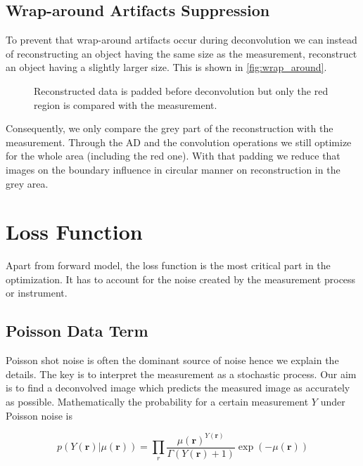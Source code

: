 \documentclass{juliacon}
\begin{document}
\subsection{Wrap-around Artifacts Suppression}
    \label{sec:wrap}
    To prevent that wrap-around artifacts occur during deconvolution we can instead
    of reconstructing an object having the same size as the measurement, reconstruct
    an object having a slightly larger size. This is shown in \autoref{fig:wrap_around}.
    \begin{figure}[h]
        \centering
        \caption{Reconstructed data is padded before deconvolution but only the red region is compared with the measurement.}
        \label{fig:wrap_around}
    \end{figure}
    Consequently, we only compare the grey part of the reconstruction with the measurement.
    Through the AD and the convolution operations we still optimize for the whole area (including the red one).
    With that padding we reduce that images on the boundary influence in circular manner on reconstruction in the grey area.


\section{Loss Function}
    Apart from forward model, the loss function is the most critical part in the optimization.
    It has to account for the noise created by the measurement process or instrument. 

\subsection{Poisson Data Term}
    Poisson shot noise is often the dominant source of noise hence we 
    explain the details.
    The key is to interpret the measurement as a stochastic process. 
    Our aim is to find a deconvolved image which predicts the measured image as accurately as 
    possible.
    Mathematically the probability for a certain measurement $Y$ under Poisson noise is


\begin{equation}
    p(Y(\mathbf r)|\mu(\mathbf r)) = \prod_r \frac{\mu(\mathbf r)^{Y(\mathbf r)}}{\Gamma(Y(\mathbf r) + 1)} \exp(- \mu(\mathbf r))
\end{equation}
\end{document}
